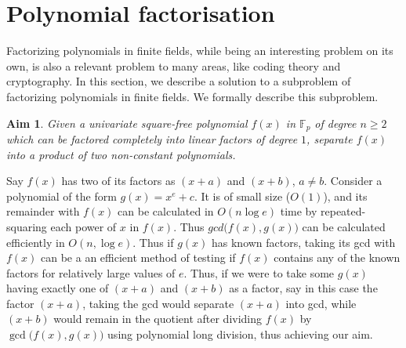 \documentclass{report}
\newtheorem*{aim*}{Aim}
\begin{document}
\section{Polynomial factorisation}
Factorizing polynomials in finite fields, while being an interesting problem on its own, is also a relevant problem to many areas, like coding theory and cryptography. In this section, we describe a solution to a subproblem of factorizing polynomials in finite fields. We formally describe this subproblem. %
%
\begin{aim*}
Given a univariate square-free polynomial $f(x)$ in $\mathbb{F}_p$ of degree $n\geq 2$ which can be factored completely into linear factors of degree $1$, separate $f(x)$ into a product of two non-constant polynomials.
\end{aim*}
%
Say $f(x)$ has two of its factors as $(x+a)$ and $(x+b)$, $a\neq b$. Consider a polynomial of the form $g(x)=x^e+c$. It is of small size ($O(1)$), and its remainder with $f(x)$ can be calculated in $O(n\log e)$ time by repeated-squaring each power of $x$ in $f(x)$. Thus $gcd\big(f(x),g(x)\big)$ can be calculated efficiently in $O(n, \log e)$. Thus if $g(x)$ has known factors, taking its gcd with $f(x)$ can be a an efficient method of testing if $f(x)$ contains any of the known factors for relatively large values of $e$. Thus, if we were to take some $g(x)$ having exactly one of $(x+a)$ and $(x+b)$ as a factor, say in this case the factor $(x+a)$, taking the gcd would separate $(x+a)$ into gcd, while $(x+b)$ would remain in the quotient after dividing $f(x)$ by $\gcd\big(f(x),g(x)\big)$ using polynomial long division, thus achieving our aim.
\end{document}
